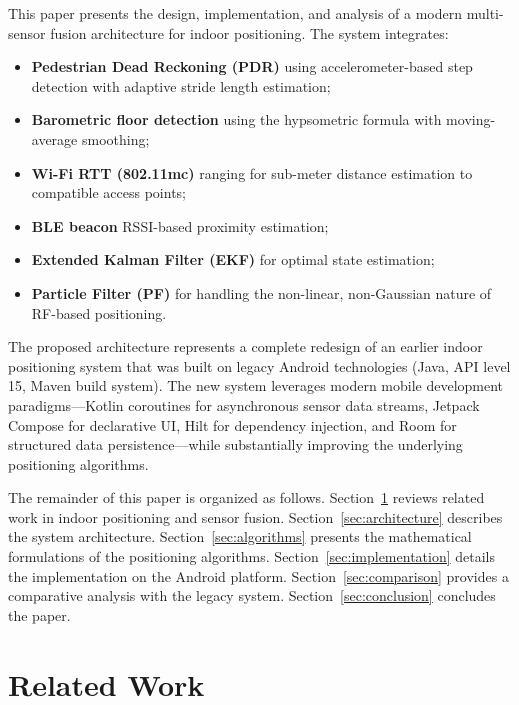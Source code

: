 \documentclass[journal,twocolumn]{IEEEtran}
\begin{document}
This paper presents the design, implementation, and analysis of a modern multi-sensor fusion architecture for indoor positioning. The system integrates:
\begin{itemize}
    \item \textbf{Pedestrian Dead Reckoning (PDR)} using accelerometer-based step detection with adaptive stride length estimation;
    \item \textbf{Barometric floor detection} using the hypsometric formula with moving-average smoothing;
    \item \textbf{Wi-Fi RTT (802.11mc)} ranging for sub-meter distance estimation to compatible access points;
    \item \textbf{BLE beacon} RSSI-based proximity estimation;
    \item \textbf{Extended Kalman Filter (EKF)} for optimal state estimation;
    \item \textbf{Particle Filter (PF)} for handling the non-linear, non-Gaussian nature of RF-based positioning.
\end{itemize}

The proposed architecture represents a complete redesign of an earlier indoor positioning system \cite{dalgin_legacy} that was built on legacy Android technologies (Java, API level 15, Maven build system). The new system leverages modern mobile development paradigms---Kotlin coroutines for asynchronous sensor data streams, Jetpack Compose for declarative UI, Hilt for dependency injection, and Room for structured data persistence---while substantially improving the underlying positioning algorithms.

The remainder of this paper is organized as follows. Section~\ref{sec:related} reviews related work in indoor positioning and sensor fusion. Section~\ref{sec:architecture} describes the system architecture. Section~\ref{sec:algorithms} presents the mathematical formulations of the positioning algorithms. Section~\ref{sec:implementation} details the implementation on the Android platform. Section~\ref{sec:comparison} provides a comparative analysis with the legacy system. Section~\ref{sec:conclusion} concludes the paper.

\section{Related Work}
\label{sec:related}
\end{document}

